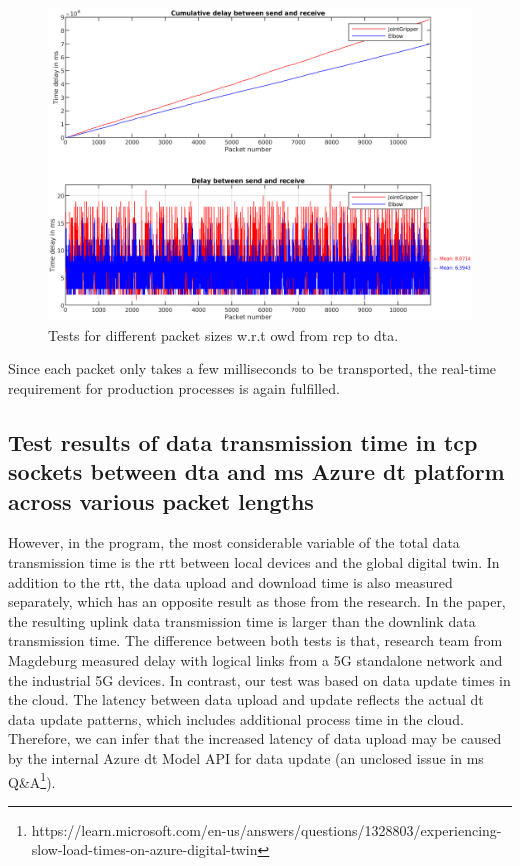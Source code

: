 \begin{figure}[htb]
    \centering
    \includegraphics[width=\textwidth]{figures/tests/DT/Delay_SendReceive_JointGripper_Elbow.png}
    \caption{Tests for different packet sizes w.r.t \gls{owd} from \gls{rcp} 
    to \gls{dta}. \label{fig: SR-JointGripper-Elbow}}
\end{figure}

Since each packet only takes a few milliseconds to be transported, the real-time 
requirement for production processes is again fulfilled. 



\subsection{Test results of data transmission time in \gls{tcp} sockets between \gls{dta} 
and \gls{ms} Azure \gls{dt} platform across various packet lengths} \label{chap: Result-DTA-DT}

However, in the program, the most considerable variable of 
the total data transmission time is the \gls{rtt} between local devices and the global digital 
twin. In addition to the \gls{rtt}, the data upload and download time is also measured 
separately, which has an opposite result as those from the research\cite{cainelli_performance_2023}. 
In the paper, the resulting uplink data transmission time is larger than the downlink 
data transmission time. The difference between both tests is that, research team from 
Magdeburg measured delay with logical links from a 5G standalone network and the industrial 
5G devices. In contrast, our test was based on data update times in the cloud. The latency 
between data upload and update reflects the actual \gls{dt} data update patterns, 
which includes additional process time in the cloud. Therefore, we can infer that the 
increased latency of data upload may be caused by the internal Azure \gls{dt} Model 
API for data update (an unclosed issue in \gls{ms} Q\&A\footnote[2]{https://learn.microsoft.com/en-us/answers/questions/1328803/experiencing-slow-load-times-on-azure-digital-twin}).
    

